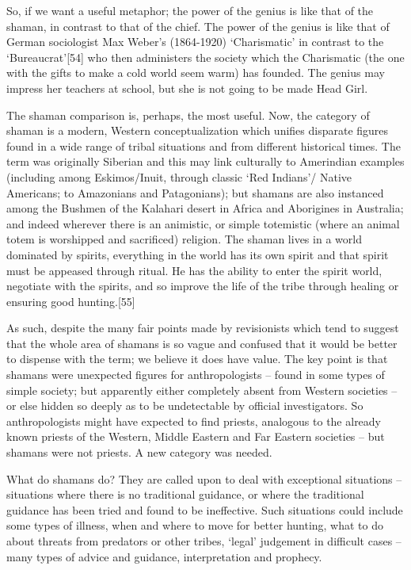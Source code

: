 \documentclass[
]{book}
\begin{document}
So, if we want a useful metaphor; the power of the genius is like that of the shaman, in contrast to that of the chief. The power of the genius is like that of German sociologist Max Weber's (1864-1920) `Charismatic' in contrast to the `Bureaucrat'{[}54{]} who then administers the society which the Charismatic (the one with the gifts to make a cold world seem warm) has founded. The genius may impress her teachers at school, but she is not going to be made Head Girl.

The shaman comparison is, perhaps, the most useful. Now, the category of shaman is a modern, Western conceptualization which unifies disparate figures found in a wide range of tribal situations and from different historical times. The term was originally Siberian and this may link culturally to Amerindian examples (including among Eskimos/Inuit, through classic `Red Indians'/ Native Americans; to Amazonians and Patagonians); but shamans are also instanced among the Bushmen of the Kalahari desert in Africa and Aborigines in Australia; and indeed wherever there is an animistic, or simple totemistic (where an animal totem is worshipped and sacrificed) religion. The shaman lives in a world dominated by spirits, everything in the world has its own spirit and that spirit must be appeased through ritual. He has the ability to enter the spirit world, negotiate with the spirits, and so improve the life of the tribe through healing or ensuring good hunting.{[}55{]}

As such, despite the many fair points made by revisionists which tend to suggest that the whole area of shamans is so vague and confused that it would be better to dispense with the term; we believe it does have value. The key point is that shamans were unexpected figures for anthropologists -- found in some types of simple society; but apparently either completely absent from Western societies -- or else hidden so deeply as to be undetectable by official investigators. So anthropologists might have expected to find priests, analogous to the already known priests of the Western, Middle Eastern and Far Eastern societies -- but shamans were not priests. A new category was needed.

What do shamans do? They are called upon to deal with exceptional situations -- situations where there is no traditional guidance, or where the traditional guidance has been tried and found to be ineffective. Such situations could include some types of illness, when and where to move for better hunting, what to do about threats from predators or other tribes, `legal' judgement in difficult cases -- many types of advice and guidance, interpretation and prophecy.
\end{document}
